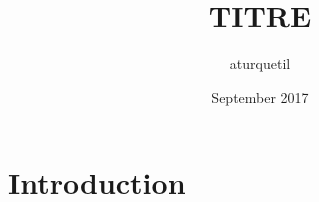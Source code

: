 \documentclass{article}
\title{TITRE}
\author{aturquetil}
\date{September 2017}
\begin{document}
\maketitle

\section{Introduction}
\end{document}
